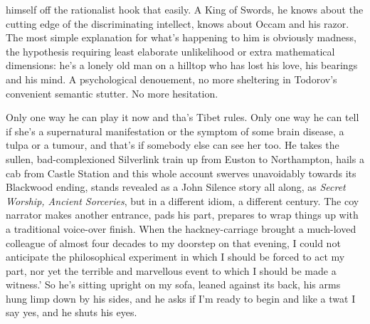 \documentclass[
]{article}
\begin{document}
himself off the rationalist hook that easily. A King of Swords, he knows
about the cutting edge of the discriminating intellect, knows about
Occam and his razor. The most simple explanation for what's happening to
him is obviously madness, the hypothesis requiring least elaborate
unlikelihood or extra mathematical dimensions: he's a lonely old man on
a hilltop who has lost his love, his bearings and his mind. A
psychological denouement, no more sheltering in Todorov's convenient
semantic stutter. No more hesitation. \par
Only one way he can play it now and tha's Tibet rules. Only one
way he can tell if she's a supernatural manifestation or the symptom of
some brain disease, a tulpa or a tumour, and that's if somebody else can
see her too. He takes the sullen, bad-complexioned Silverlink train up
from Euston to Northampton, hails a cab from Castle Station and this
whole account swerves unavoidably towards its Blackwood ending, stands
revealed as a John Silence story all along, as \emph{Secret Worship,
Ancient Sorceries}, but in a different idiom, a different century. The
coy narrator makes another entrance, pads his part, prepares to wrap
things up with a traditional voice-over finish. When the
hackney-carriage brought a much-loved colleague of almost four decades
to my doorstep on that evening, I could not anticipate the philosophical
experiment in which I should be forced to act my part, nor yet the
terrible and marvellous event to which I should be made a witness.' So
he's sitting upright on my sofa, leaned against its back, his arms hung
limp down by his sides, and he asks if I'm ready to begin and like a
twat I say yes, and he shuts his eyes. \par
\end{document}
